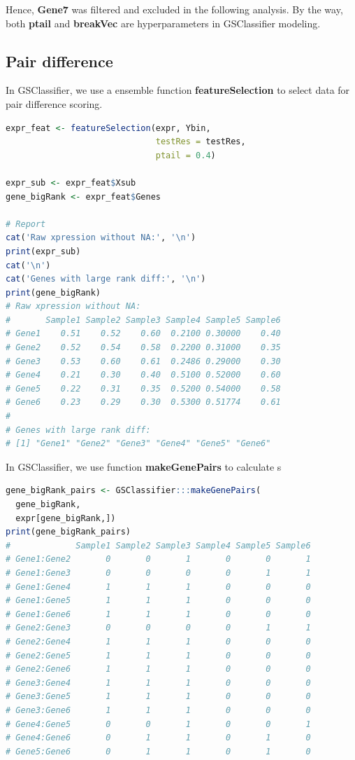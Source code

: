 \documentclass[
  12pt,
]{book}
\begin{document}
Hence, \textbf{Gene7} was filtered and excluded in the following analysis. By the way, both \textbf{ptail} and \textbf{breakVec} are hyperparameters in GSClassifier modeling.

\hypertarget{pair-difference}{%
\subsection{Pair difference}\label{pair-difference}}

In GSClassifier, we use a ensemble function \textbf{featureSelection} to select data for pair difference scoring.

\begin{lstlisting}[language=R]
expr_feat <- featureSelection(expr, Ybin,
                              testRes = testRes,
                              ptail = 0.4)

expr_sub <- expr_feat$Xsub
gene_bigRank <- expr_feat$Genes

# Report
cat('Raw xpression without NA:', '\n')
print(expr_sub)
cat('\n')
cat('Genes with large rank diff:', '\n')
print(gene_bigRank)
# Raw xpression without NA: 
#       Sample1 Sample2 Sample3 Sample4 Sample5 Sample6
# Gene1    0.51    0.52    0.60  0.2100 0.30000    0.40
# Gene2    0.52    0.54    0.58  0.2200 0.31000    0.35
# Gene3    0.53    0.60    0.61  0.2486 0.29000    0.30
# Gene4    0.21    0.30    0.40  0.5100 0.52000    0.60
# Gene5    0.22    0.31    0.35  0.5200 0.54000    0.58
# Gene6    0.23    0.29    0.30  0.5300 0.51774    0.61
# 
# Genes with large rank diff: 
# [1] "Gene1" "Gene2" "Gene3" "Gene4" "Gene5" "Gene6"
\end{lstlisting}

In GSClassifier, we use function \textbf{makeGenePairs} to calculate s

\begin{lstlisting}[language=R]
gene_bigRank_pairs <- GSClassifier:::makeGenePairs(
  gene_bigRank, 
  expr[gene_bigRank,])
print(gene_bigRank_pairs)
#             Sample1 Sample2 Sample3 Sample4 Sample5 Sample6
# Gene1:Gene2       0       0       1       0       0       1
# Gene1:Gene3       0       0       0       0       1       1
# Gene1:Gene4       1       1       1       0       0       0
# Gene1:Gene5       1       1       1       0       0       0
# Gene1:Gene6       1       1       1       0       0       0
# Gene2:Gene3       0       0       0       0       1       1
# Gene2:Gene4       1       1       1       0       0       0
# Gene2:Gene5       1       1       1       0       0       0
# Gene2:Gene6       1       1       1       0       0       0
# Gene3:Gene4       1       1       1       0       0       0
# Gene3:Gene5       1       1       1       0       0       0
# Gene3:Gene6       1       1       1       0       0       0
# Gene4:Gene5       0       0       1       0       0       1
# Gene4:Gene6       0       1       1       0       1       0
# Gene5:Gene6       0       1       1       0       1       0
\end{lstlisting}
\end{document}
